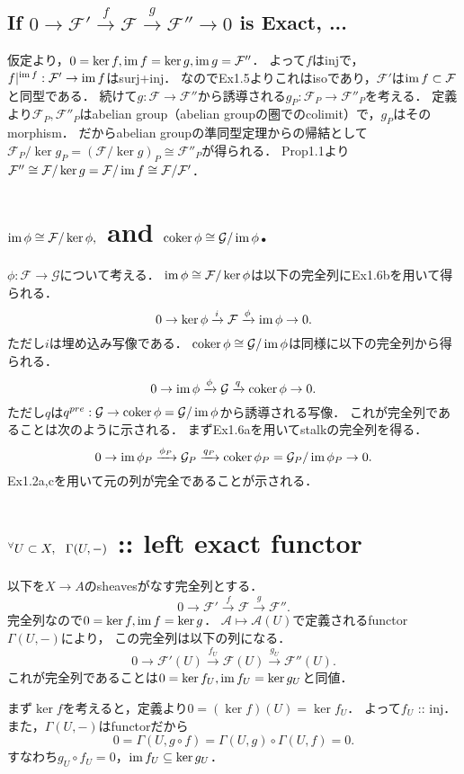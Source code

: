 \documentclass[a4paper]{jsarticle}
\newcommand{\shA}{\mathcal{A}}
\newcommand{\shF}{\mathcal{F}}
\newcommand{\shG}{\mathcal{G}}
\begin{document}
    \subsection{If $0 \to \shF' \xrightarrow{f} \shF \xrightarrow{g} \shF'' \to 0$ is Exact, ...}
    仮定より，$0=\ker f, \im f=\ker g, \im g=\shF''$．
    よって$f$はinjで，$f|^{\im f}: \shF' \to \im f$はsurj+inj．
    なのでEx1.5よりこれはisoであり，$\shF'$は$\im f \subset \shF$と同型である．
    続けて$g:\shF \to \shF''$から誘導される$g_P: \shF_P \to \shF''_P$を考える．
    定義より$\shF_P, \shF''_P$はabelian group（abelian groupの圏でのcolimit）で，$g_P$はそのmorphism．
    だからabelian groupの準同型定理からの帰結として$\shF_P/\ker g_P=(\shF/\ker g)_P \cong \shF''_P$が得られる．
    Prop1.1より$\shF'' \cong \shF/\ker g=\shF/\im f \cong \shF/\shF'$．

\section{$\im \phi \cong \shF/\ker \phi,$ and $\coker \phi \cong \shG/\im \phi$.} %
    $\phi: \shF \to \shG$について考える．
    $\im \phi \cong \shF/\ker \phi$は以下の完全列にEx1.6bを用いて得られる．
    \[ 0 \to \ker \phi \xrightarrow{i} \shF \xrightarrow{\phi} \im \phi \to 0. \]
    ただし$i$は埋め込み写像である．
    $\coker \phi \cong \shG/\im \phi$は同様に以下の完全列から得られる．
    \[ 0 \to \im \phi \xrightarrow{\phi} \shG \xrightarrow{q} \coker \phi \to 0. \]
    ただし$q$は$q^{pre}: \shG \to \coker \phi=\shG/\im \phi$から誘導される写像．
    これが完全列であることは次のように示される．
    まずEx1.6aを用いてstalkの完全列を得る．
    \[ 0 \to \im \phi_P \xrightarrow{\phi_P} \shG_P \xrightarrow{q_P} \coker \phi_P=\shG_P/\im \phi_P \to 0. \]
    Ex1.2a,cを用いて元の列が完全であることが示される．

\section{${}^{\forall} U \subset X,~~ \Gamma(U,-)$ :: left exact functor} %
    以下を$X \to A$のsheavesがなす完全列とする．
    \[ 0 \to \shF' \xrightarrow{f} \shF \xrightarrow{g} \shF''. \]
    完全列なので$0=\ker f, \operatorname{im} f=\ker g$．
    $\shA \mapsto \shA(U)$で定義されるfunctor $\Gamma(U,-)$により，
    この完全列は以下の列になる．
    \[ 0 \to \shF'(U) \xrightarrow{f_U} \shF(U) \xrightarrow{g_U} \shF''(U). \]
    これが完全列であることは$0=\ker f_U, \operatorname{im} f_U=\ker g_U$と同値．

    まず$\ker f$を考えると，定義より$0=(\ker f)(U)=\ker f_U$．
    よって$f_U$ :: inj．
    また，$\Gamma(U,-)$はfunctorだから
    \[ 0=\Gamma(U,g \circ f)=\Gamma(U,g) \circ \Gamma(U,f)=0. \]
    すなわち$g_U \circ f_U=0$，$\operatorname{im} f_U \subseteq \ker g_U$．
\end{document}
